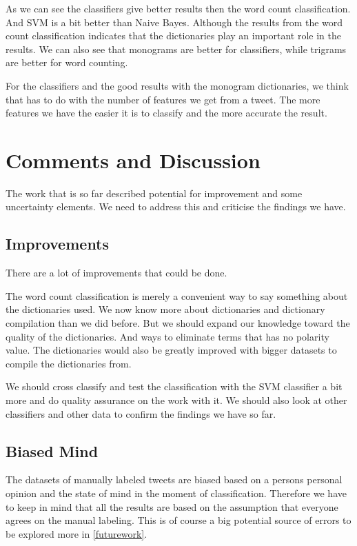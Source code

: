 As we can see the classifiers give better results then the word count
classification. And SVM is a bit better than Naive Bayes. Although the results
from the word count classification indicates that the dictionaries play an
important role in the results. We can also see that monograms are better for
classifiers, while trigrams are better for word counting.

For the classifiers and the good results with the monogram dictionaries, we think
that has to do with the number of features we get from a tweet. The more
features we have the easier it is to classify and the more accurate the result.
%

\section{Comments and Discussion}\label{sentiment:comments_discussion}
The work that is so far described potential for improvement and some
uncertainty elements. We need to address this and criticise the findings we
have.  

\subsection{Improvements}
There are a lot of improvements that could be done. 

The word count classification is merely a convenient way to say something about
the dictionaries used. We now know more about dictionaries and dictionary
compilation than we did before. But we should expand our knowledge toward the
quality of the dictionaries. And ways to eliminate terms that has no polarity
value. The dictionaries would also be greatly improved with bigger datasets to
compile the dictionaries from. 

We should cross classify and test the classification with the SVM classifier a
bit more and do quality assurance on the work with it. We should also look at
other classifiers and other data to confirm the findings we have so far. 

\subsection{Biased Mind}
The datasets of manually labeled tweets are biased based on a persons 
personal opinion and the state of mind in the moment of classification.
Therefore we have to keep in mind that all the results are based on the
assumption that everyone agrees on the manual labeling. This is of course a big
potential source of errors to be explored more in \ref{futurework}.

